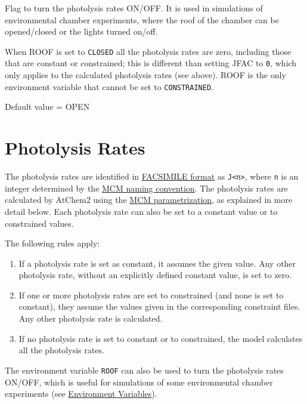 Flag to turn the photolysis rates ON/OFF. It is used in simulations of
environmental chamber experiments, where the roof of the chamber can
be opened/closed or the lights turned on/off.

When ROOF is set to \texttt{CLOSED} all the photolysis rates are zero,
including those that are constant or constrained; this is different
than setting JFAC to \texttt{0}, which only applies to the calculated
photolysis rates (see above). ROOF is the only environment variable
that cannot be set to \texttt{CONSTRAINED}.

Default value = OPEN

\section{Photolysis Rates} \label{sec:photolysis-rates}

The photolysis rates are identified in
\hyperref[sec:chemical-mechanism]{FACSIMILE format} as \verb|J<n>|,
where \texttt{n} is an integer determined by the
\href{http://mcm.leeds.ac.uk/MCM/parameters/photolysis.htt}{MCM naming
  convention}. The photolysis rates are calculated by AtChem2 using
the
\href{http://mcm.leeds.ac.uk/MCM/parameters/photolysis_param.htt}{MCM
  parametrization}, as explained in more detail below. Each photolysis
rate can also be set to a constant value or to constrained values.

The following rules apply:

\begin{enumerate}
\item If a photolysis rate is set as constant, it assumes the given
  value. Any other photolysis rate, without an explicitly defined
  constant value, is set to zero.
\item If one or more photolysis rates are set to constrained (and none
  is set to constant), they assume the values given in the
  corresponding constraint files. Any other photolysis rate is
  calculated.
\item If no photolysis rate is set to constant or to constrained, the
  model calculates all the photolysis rates.
\end{enumerate}

The environment variable \texttt{ROOF} can also be used to turn the
photolysis rates ON/OFF, which is useful for simulations of some
environmental chamber experiments (see
\hyperref[sec:environment-variables]{Environment Variables}).

